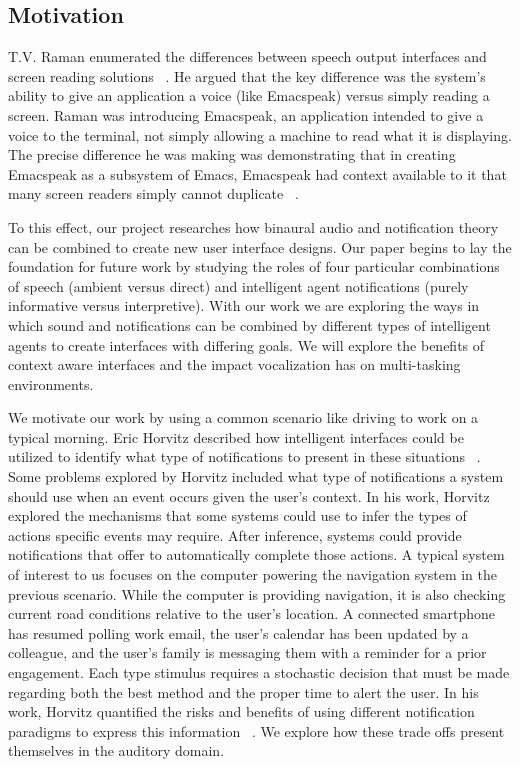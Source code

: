 \subsection{                 Motivation                                      }

T.V. Raman enumerated the differences between speech output interfaces and
screen reading solutions ~. He argued that the key
difference was the system's ability to give an application a voice (like 
Emacspeak) versus simply reading a screen. Raman was introducing Emacspeak, an 
application intended to give a voice to the terminal, not simply allowing a 
machine to read what it is displaying. The precise difference he was making was
demonstrating that in creating Emacspeak as a subsystem of Emacs, Emacspeak had
context available to it that many screen readers simply cannot duplicate
~\cite{raman1996emacspeak}.

To this effect, our project researches how binaural audio and notification theory
can be combined to create new user interface designs. Our paper begins to lay the
foundation for future work by studying the roles of four particular combinations
of speech (ambient versus direct) and intelligent agent notifications (purely 
informative versus interpretive). With our work we are exploring the ways in which
sound and notifications can be combined by different types of intelligent agents
to create interfaces with differing goals. We will explore the benefits of context
aware interfaces and the impact vocalization has on multi-tasking environments.


We motivate our work by using a common scenario like driving to work on a typical 
morning. Eric Horvitz described how intelligent interfaces could be utilized to identify
what type of notifications to present in these situations ~\cite{horvitz1999principles}.
Some problems explored by Horvitz included what type of notifications a system should
use when an event occurs given the user's context.  In his work, Horvitz explored the
mechanisms that some systems could use to infer the types of actions specific events 
may require. After inference, systems could provide notifications that offer to
automatically complete those actions.  A typical system of interest to us focuses
on the computer powering the navigation system in the previous scenario. While the
computer is providing navigation, it is also checking current road conditions 
relative to the user's location. A connected smartphone has resumed polling work 
email, the user's calendar has been updated by a colleague, and the user's 
family is messaging them with a reminder for a prior engagement.  Each type stimulus
requires a stochastic decision that must be made regarding both the best method and 
the proper time to alert the user. In his work, Horvitz quantified
the risks and benefits of using different notification paradigms to express this 
information ~\cite{horvitz1999principles}. We explore how these trade offs present 
themselves in the auditory domain.

